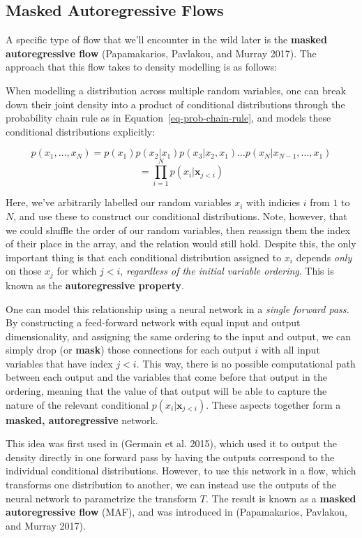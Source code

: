 \documentclass[
  11pt,
  numbers=noendperiod]{book}
\begin{document}
\hypertarget{sec-maf}{%
\subsection{Masked Autoregressive Flows}\label{sec-maf}}

A specific type of flow that we'll encounter in the wild later is the
\textbf{masked autoregressive flow} (Papamakarios, Pavlakou, and Murray
2017). The approach that this flow takes to density modelling is as
follows:

When modelling a distribution across multiple random variables, one can
break down their joint density into a product of conditional
distributions through the probability chain rule as in
Equation~\ref{eq-prob-chain-rule}, and models these conditional
distributions explicitly:

\[
p(x_1, \dots, x_N) = p(x_1)p(x_2 | x_1)p(x_3|x_2, x_1)\dots p(x_N | x_{N-1}, \dots, x_1)
\] \[
=\prod_{i=1}^Np(x_i|\mathbf{x}_{j<i})
\]

Here, we've arbitrarily labelled our random variables \(x_i\) with
indicies \(i\) from \(1\) to \(N\), and use these to construct our
conditional distributions. Note, however, that we could shuffle the
order of our random variables, then reassign them the index of their
place in the array, and the relation would still hold. Despite this, the
only important thing is that each conditional distribution assigned to
\(x_i\) depends \emph{only} on those \(x_j\) for which \(j<i\),
\emph{regardless of the initial variable ordering}. This is known as the
\textbf{autoregressive property}.

One can model this relationship using a neural network in a \emph{single
forward pass.} By constructing a feed-forward network with equal input
and output dimensionality, and assigning the same ordering to the input
and output, we can simply drop (or \textbf{mask}) those connections for
each output \(i\) with all input variables that have index \(j<i\). This
way, there is no possible computational path between each output and the
variables that come before that output in the ordering, meaning that the
value of that output will be able to capture the nature of the relevant
conditional \(p(x_i | \mathbf{x}_{j<i})\). These aspects together form a
\textbf{masked, autoregressive} network.

This idea was first used in (Germain et al. 2015), which used it to
output the density directly in one forward pass by having the outputs
correspond to the individual conditional distributions. However, to use
this network in a flow, which transforms one distribution to another, we
can instead use the outputs of the neural network to parametrize the
transform \(T\). The result is known as a \textbf{masked autoregressive
flow} (MAF), and was introduced in (Papamakarios, Pavlakou, and Murray
2017).
\end{document}
